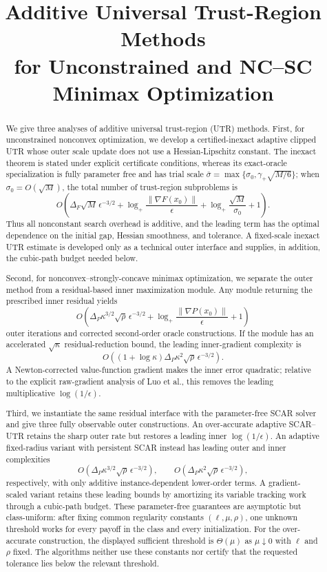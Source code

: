 \documentclass{article}
\title{Additive Universal Trust-Region Methods\\
for Unconstrained and NC--SC Minimax Optimization}
\author{}
\date{}
\begin{document}
\maketitle

\begin{abstract}
We give three analyses of additive universal trust-region (UTR)
methods.  First, for unconstrained nonconvex optimization, we develop
a certified-inexact adaptive clipped UTR whose outer scale update does
not use a Hessian-Lipschitz constant.  The inexact theorem is stated
under explicit certificate conditions, whereas its exact-oracle
specialization is fully parameter free and has trial scale
$\bar\sigma=\max\{\sigma_0,\gamma_+\sqrt{M/6}\}$; when
$\sigma_0=O(\sqrt M)$, the total number of trust-region subproblems is
\[
 O\!\left(\Delta_F\sqrt M\,\epsilon^{-3/2}
 +\log_+\!\frac{\|\nabla F(x_0)\|}{\epsilon}
 +\log_+\!\frac{\sqrt M}{\sigma_0}+1\right).
\]
Thus all nonconstant search overhead is additive, and the leading term
has the optimal dependence on the initial gap, Hessian smoothness, and
tolerance.  A fixed-scale inexact UTR estimate is developed only as a
technical outer interface and supplies, in addition, the cubic-path
budget needed below.

Second, for nonconvex--strongly-concave minimax optimization, we
separate the outer method from a residual-based inner maximization
module.  Any module returning the prescribed inner residual yields
\[
 O\!\left(\Delta_P\kappa^{3/2}\sqrt\rho\,\epsilon^{-3/2}
 +\log_+\!\frac{\|\nabla P(x_0)\|}{\epsilon}+1\right)
\]
outer iterations and corrected second-order oracle constructions.  If
the module has an accelerated $\sqrt\kappa$ residual-reduction bound,
the leading inner-gradient complexity is
\[
 O\!\left((1+\log\kappa)\Delta_P\kappa^2\sqrt\rho\,
 \epsilon^{-3/2}\right).
\]
A Newton-corrected value-function gradient makes the inner error
quadratic; relative to the explicit raw-gradient analysis of Luo et
al., this removes the leading multiplicative $\log(1/\epsilon)$.

Third, we instantiate the same residual interface with the
parameter-free SCAR solver and give three fully observable outer
constructions.  An over-accurate adaptive SCAR--UTR retains the sharp
outer rate but restores a leading inner $\log(1/\epsilon)$.  An
adaptive fixed-radius variant with persistent SCAR instead has leading
outer and inner complexities
\[
 O(\Delta_P\kappa^{3/2}\sqrt\rho\,\epsilon^{-3/2}),
 \qquad
 O(\Delta_P\kappa^2\sqrt\rho\,\epsilon^{-3/2}),
\]
respectively, with only additive instance-dependent lower-order terms.
A gradient-scaled variant retains these leading bounds by amortizing
its variable tracking work through a cubic-path budget.
These parameter-free guarantees are asymptotic but class-uniform: after
fixing common regularity constants $(\ell,\mu,\rho)$, one unknown
threshold works for every payoff in the class and every initialization.
For the over-accurate construction, the displayed sufficient threshold
is $\Theta(\mu)$ as $\mu\downarrow0$ with $\ell$ and $\rho$ fixed.  The
algorithms neither use these constants nor certify that the requested
tolerance lies below the relevant threshold.
\end{abstract}
\end{document}
